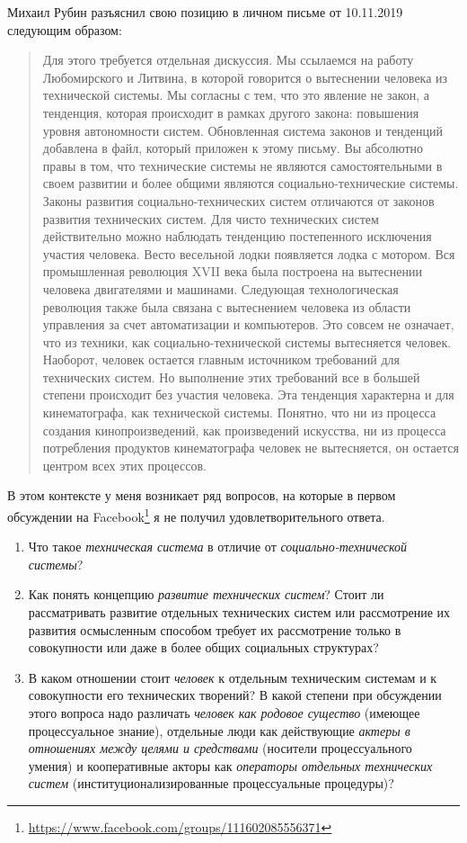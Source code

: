 \documentclass[11pt,a4paper]{article}
\begin{document}
Михаил Рубин разъяснил свою позицию в личном письме от 10.11.2019 следующим
образом:
\begin{quote}
  Для этого требуется отдельная дискуссия. Мы ссылаемся на работу Любомирского
  и Литвина, в которой говорится о вытеснении человека из технической системы.
  Мы согласны с тем, что это явление не закон, а тенденция, которая происходит
  в рамках другого закона: повышения уровня автономности систем. Обновленная
  система законов и тенденций добавлена в файл, который приложен к этому
  письму.  Вы абсолютно правы в том, что технические системы не являются
  самостоятельными в своем развитии и более общими являются
  социально-технические системы. Законы развития социально-технических систем
  отличаются от законов развития технических систем. Для чисто технических
  систем действительно можно наблюдать тенденцию постепенного исключения
  участия человека. Весто весельной лодки появляется лодка с мотором. Вся
  промышленная революция XVII века была построена на вытеснении человека
  двигателями и машинами. Следующая технологическая революция также была
  связана с вытеснением человека из области управления за счет автоматизации и
  компьютеров. Это совсем не означает, что из техники, как
  социально-технической системы вытесняется человек. Наоборот, человек
  остается главным источником требований для технических систем. Но выполнение
  этих требований все в большей степени происходит без участия человека. Эта
  тенденция характерна и для кинематографа, как технической системы. Понятно,
  что ни из процесса создания кинопроизведений, как произведений искусства, ни
  из процесса потребления продуктов кинематографа человек не вытесняется, он
  остается центром всех этих процессов. 
\end{quote}
В этом контексте у меня возникает ряд вопросов, на которые в первом обсуждении
на Facebook\footnote{\url{https://www.facebook.com/groups/111602085556371}} я
не получил удовлетворительного ответа.
\begin{enumerate}
\item Что такое \emph{техническая система} в отличие от
  \emph{социально-технической системы}?
\item Как понять концепцию \emph{развитие технических систем}?  Стоит ли
  рассматривать развитие отдельных технических систем или рассмотрение их
  развития осмысленным способом требует их рассмотрение только в совокупности
  или даже в более общих социальных структурах?
\item В каком отношении стоит \emph{человек} к отдельным техническим системам
  и к совокупности его технических творений? В какой степени при обсуждении
  этого вопроса надо различать \emph{человек как родовое существо} (имеющее
  процессуальное знание), отдельные люди как действующие \emph{актеры в
    отношениях между целями и средствами} (носители процессуального умения) и
  кооперативные акторы как \emph{операторы отдельных технических систем}
  (институционализированные процессуальные процедуры)?
\end{enumerate}
\end{document}
